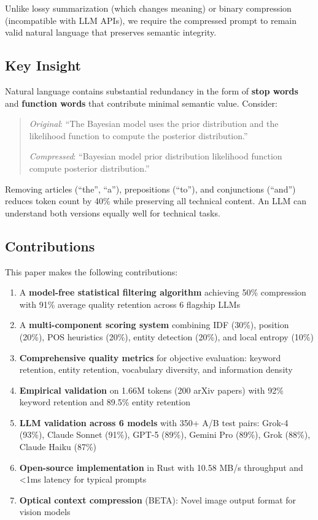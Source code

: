 Unlike lossy summarization (which changes meaning) or binary compression (incompatible with LLM APIs), we require the compressed prompt to remain valid natural language that preserves semantic integrity.

\subsection{Key Insight}

Natural language contains substantial redundancy in the form of \textbf{stop words} and \textbf{function words} that contribute minimal semantic value. Consider:

\begin{quote}
\textit{Original}: ``The Bayesian model uses the prior distribution and the likelihood function to compute the posterior distribution.''

\textit{Compressed}: ``Bayesian model prior distribution likelihood function compute posterior distribution.''
\end{quote}

Removing articles (``the'', ``a''), prepositions (``to''), and conjunctions (``and'') reduces token count by 40\% while preserving all technical content. An LLM can understand both versions equally well for technical tasks.

\subsection{Contributions}

This paper makes the following contributions:

\begin{enumerate}
    \item A \textbf{model-free statistical filtering algorithm} achieving 50\% compression with 91\% average quality retention across 6 flagship LLMs
    \item A \textbf{multi-component scoring system} combining IDF (30\%), position (20\%), POS heuristics (20\%), entity detection (20\%), and local entropy (10\%)
    \item \textbf{Comprehensive quality metrics} for objective evaluation: keyword retention, entity retention, vocabulary diversity, and information density
    \item \textbf{Empirical validation} on 1.66M tokens (200 arXiv papers) with 92\% keyword retention and 89.5\% entity retention
    \item \textbf{LLM validation across 6 models} with 350+ A/B test pairs: Grok-4 (93\%), Claude Sonnet (91\%), GPT-5 (89\%), Gemini Pro (89\%), Grok (88\%), Claude Haiku (87\%)
    \item \textbf{Open-source implementation} in Rust with 10.58 MB/s throughput and <1ms latency for typical prompts
    \item \textbf{Optical context compression} (BETA): Novel image output format for vision models
\end{enumerate}

